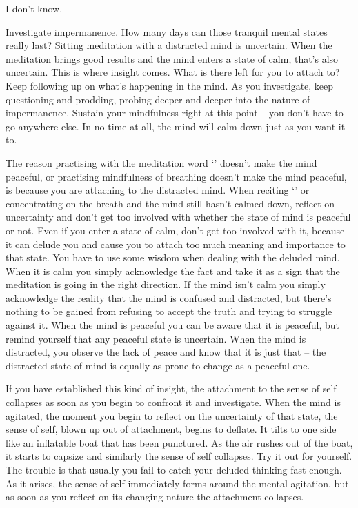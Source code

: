  I don't know.

 Investigate impermanence. How many days can those tranquil mental states really last? Sitting meditation with a distracted mind is uncertain. When the meditation brings good results and the mind enters a state of calm, that's also uncertain. This is where insight comes. What is there left for you to attach to? Keep following up on what's happening in the mind. As you investigate, keep questioning and prodding, probing deeper and deeper into the nature of impermanence. Sustain your mindfulness right at this point -- you don't have to go anywhere else. In no time at all, the mind will calm down just as you want it to.

The reason practising with the meditation word `' doesn't make the mind peaceful, or practising mindfulness of breathing doesn't make the mind peaceful, is because you are attaching to the distracted mind. When reciting `' or concentrating on the breath and the mind still hasn't calmed down, reflect on uncertainty and don't get too involved with whether the state of mind is peaceful or not. Even if you enter a state of calm, don't get too involved with it, because it can delude you and cause you to attach too much meaning and importance to that state. You have to use some wisdom when dealing with the deluded mind. When it is calm you simply acknowledge the fact and take it as a sign that the meditation is going in the right direction. If the mind isn't calm you simply acknowledge the reality that the mind is confused and distracted, but there's nothing to be gained from refusing to accept the truth and trying to struggle against it. When the mind is peaceful you can be aware that it is peaceful, but remind yourself that any peaceful state is uncertain. When the mind is distracted, you observe the lack of peace and know that it is just that -- the distracted state of mind is equally as prone to change as a peaceful one.

If you have established this kind of insight, the attachment to the sense of self collapses as soon as you begin to confront it and investigate. When the mind is agitated, the moment you begin to reflect on the uncertainty of that state, the sense of self, blown up out of attachment, begins to deflate. It tilts to one side like an inflatable boat that has been punctured. As the air rushes out of the boat, it starts to capsize and similarly the sense of self collapses. Try it out for yourself. The trouble is that usually you fail to catch your deluded thinking fast enough. As it arises, the sense of self immediately forms around the mental agitation, but as soon as you reflect on its changing nature the attachment collapses.

